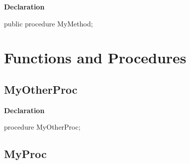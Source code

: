 \documentclass{report}
\newif\ifpdf
\begin{document}
\label{ok_links_2.TSomeOtherClass-MyMethod}
\begin{list}{}{
\setlength{\itemindent}{0cm}
\setlength{\listparindent}{0cm}
\setlength{\leftmargin}{\evensidemargin}
\addtolength{\leftmargin}{\tmplength}
\settowidth{\labelsep}{X}
\addtolength{\leftmargin}{\labelsep}
\setlength{\labelwidth}{\tmplength}
}
\item[\textbf{Declaration}\hfill]
\ifpdf
\begin{flushleft}
\fi
\begin{ttfamily}
public procedure MyMethod;\end{ttfamily}

\ifpdf
\end{flushleft}
\fi

\end{list}
\section{Functions and Procedures}
\ifpdf
\subsection*{\large{\textbf{MyOtherProc}}\normalsize\hspace{1ex}\hrulefill}
\else
\subsection*{MyOtherProc}
\fi
\label{ok_links_2-MyOtherProc}
\begin{list}{}{
\setlength{\itemindent}{0cm}
\setlength{\listparindent}{0cm}
\setlength{\leftmargin}{\evensidemargin}
\addtolength{\leftmargin}{\tmplength}
\settowidth{\labelsep}{X}
\addtolength{\leftmargin}{\labelsep}
\setlength{\labelwidth}{\tmplength}
}
\item[\textbf{Declaration}\hfill]
\ifpdf
\begin{flushleft}
\fi
\begin{ttfamily}
procedure MyOtherProc;\end{ttfamily}

\ifpdf
\end{flushleft}
\fi

\end{list}
\ifpdf
\subsection*{\large{\textbf{MyProc}}\normalsize\hspace{1ex}\hrulefill}
\else
\end{document}
